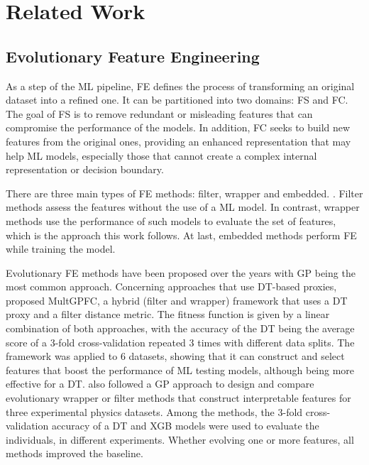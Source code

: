 \section{Related Work}
\subsection{Evolutionary Feature Engineering}

As a step of the \gls{ML} pipeline, \gls{FE} defines the process of transforming an original dataset into a refined one. It can be partitioned into two domains: \gls{FS} and \gls{FC}. The goal of \gls{FS} is to remove redundant or misleading features that can compromise the performance of the models. In addition, \gls{FC} seeks to build new features from the original ones, providing an enhanced representation that may help \gls{ML} models, especially those that cannot create a complex internal representation or decision boundary.

There are three main types of \gls{FE} methods: filter, wrapper and embedded. \cite{cherrier2019consistent}. Filter methods assess the features without the use of a \gls{ML} model. In contrast, wrapper methods use the performance of such models to evaluate the set of features, which is the approach this work follows. At last, embedded methods perform \gls{FE} while training the model.

Evolutionary \gls{FE} methods have been proposed over the years with \gls{GP} \cite{koza1994genetic} being the most common approach. Concerning approaches that use \gls{DT}-based proxies, \citet{tran2016multiple} proposed MultGPFC, a hybrid (filter and wrapper) framework that uses a \gls{DT} proxy and a filter distance metric. The fitness function is given by a linear combination of both approaches, with the accuracy of the \gls{DT} being the average score of a 3-fold cross-validation repeated 3 times with different data splits. The framework was applied to 6 datasets, showing that it can construct and select features that boost the performance of \gls{ML} testing models, although being more effective for a \gls{DT}. \citet{cherrier2019consistent} also followed a \gls{GP} approach to design and compare evolutionary wrapper or filter methods that construct interpretable features for three experimental physics datasets. Among the methods, the 3-fold cross-validation accuracy of a \gls{DT} and \gls{XGB} models were used to evaluate the individuals, in different experiments. Whether evolving one or more features, all methods improved the baseline.

